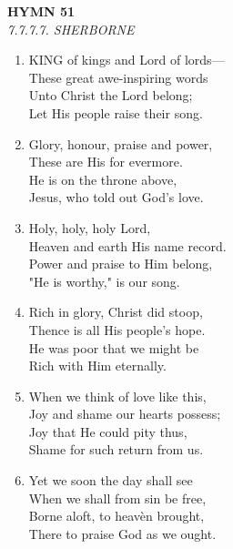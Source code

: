 \documentclass[11pt,a4paper]{article}
\begin{document}
\newpage
\begin{center}
    {\Large \textbf{HYMN 51}}
    \\
    \textit{7.7.7.7. SHERBORNE}
\end{center}
\vspace{1em}

\begin{enumerate}
    \item KING of kings and Lord of lords--- \\
        These great awe-inspiring words \\
        Unto Christ the Lord belong; \\
        Let His people raise their song.

    \item Glory, honour, praise and power, \\
        These are His for evermore. \\
        He is on the throne above, \\
        Jesus, who told out God's love.

    \item Holy, holy, holy Lord, \\
        Heaven and earth His name record. \\
        Power and praise to Him belong, \\
        "He is worthy," is our song.

    \item Rich in glory, Christ did stoop, \\
        Thence is all His people's hope. \\
        He was poor that we might be \\
        Rich with Him eternally.

    \item When we think of love like this, \\
        Joy and shame our hearts possess; \\
        Joy that He could pity thus, \\
        Shame for such return from us.

    \item Yet we soon the day shall see \\
        When we shall from sin be free, \\
        Borne aloft, to heav\`en brought, \\
        There to praise God as we ought.

\end{enumerate}
\end{document}
